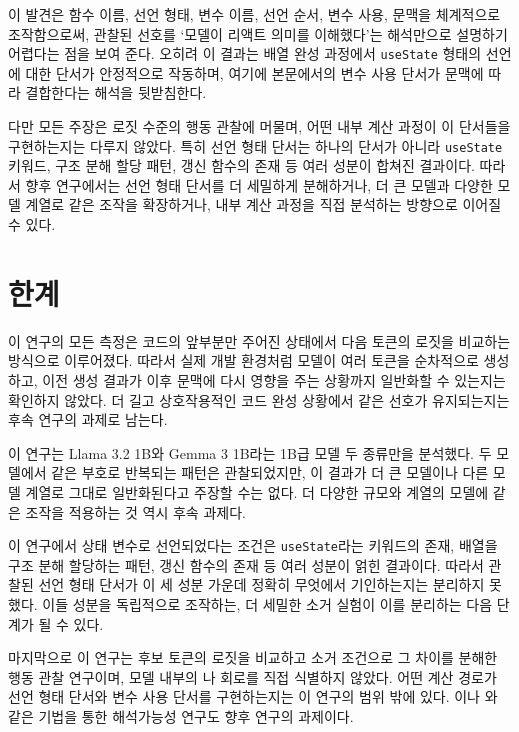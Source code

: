 \documentclass[11pt]{article}
\begin{document}
이 발견은 함수 이름, 선언 형태, 변수 이름, 선언 순서, 변수 사용, 문맥을 체계적으로 조작함으로써, 관찰된 선호를 `모델이 리액트 의미를 이해했다'는 해석만으로 설명하기 어렵다는 점을 보여 준다.
오히려 이 결과는 배열 완성 과정에서 \texttt{useState} 형태의 선언에 대한 단서가 안정적으로 작동하며, 여기에 본문에서의 변수 사용 단서가 문맥에 따라 결합한다는 해석을 뒷받침한다.

다만 모든 주장은 로짓 수준의 행동 관찰에 머물며, 어떤 내부 계산 과정이 이 단서들을 구현하는지는 다루지 않았다.
특히 선언 형태 단서는 하나의 단서가 아니라 \texttt{useState} 키워드, 구조 분해 할당 패턴, 갱신 함수의 존재 등 여러 성분이 합쳐진 결과이다.
따라서 향후 연구에서는 선언 형태 단서를 더 세밀하게 분해하거나, 더 큰 모델과 다양한 모델 계열로 같은 조작을 확장하거나, 내부 계산 과정을 직접 분석하는 방향으로 이어질 수 있다.

\section*{한계}
\label{sec:limitations}

이 연구의 모든 측정은 코드의 앞부분만 주어진 상태에서 다음 토큰의 로짓을 비교하는 방식으로 이루어졌다.
따라서 실제 개발 환경처럼 모델이 여러 토큰을 순차적으로 생성하고, 이전 생성 결과가 이후 문맥에 다시 영향을 주는 상황까지 일반화할 수 있는지는 확인하지 않았다.
더 길고 상호작용적인 코드 완성 상황에서 같은 선호가 유지되는지는 후속 연구의 과제로 남는다.

이 연구는 Llama 3.2 1B와 Gemma 3 1B라는 1B급 모델 두 종류만을 분석했다.
두 모델에서 같은 부호로 반복되는 패턴은 관찰되었지만, 이 결과가 더 큰 모델이나 다른 모델 계열로 그대로 일반화된다고 주장할 수는 없다.
더 다양한 규모와 계열의 모델에 같은 조작을 적용하는 것 역시 후속 과제다.

이 연구에서 상태 변수로 선언되었다는 조건은 \texttt{useState}라는 키워드의 존재, 배열을 구조 분해 할당하는 패턴, 갱신 함수의 존재 등 여러 성분이 얽힌 결과이다.
따라서 관찰된 선언 형태 단서가 이 세 성분 가운데 정확히 무엇에서 기인하는지는 분리하지 못했다.
이들 성분을 독립적으로 조작하는, 더 세밀한 소거 실험이 이를 분리하는 다음 단계가 될 수 있다.

마지막으로 이 연구는 후보 토큰의 로짓을 비교하고 소거 조건으로 그 차이를 분해한 행동 관찰 연구이며, 모델 내부의 나 회로를 직접 식별하지 않았다.
어떤 계산 경로가 선언 형태 단서와 변수 사용 단서를 구현하는지는 이 연구의 범위 밖에 있다.
이나 와 같은 기법을 통한 해석가능성 연구도 향후 연구의 과제이다.
\end{document}
